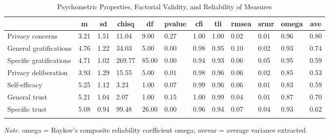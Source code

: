 \documentclass[
  english,
  man,floatsintext]{apa6}
\begin{document}
\begin{table}[tbp]

\begin{center}
\begin{threeparttable}

\caption{\label{tab:CFA}Psychometric Properties, Factorial Validity, and Reliability of Measures}

\footnotesize{

\begin{tabular}{llllllllllll}
\toprule
 & \multicolumn{1}{c}{m} & \multicolumn{1}{c}{sd} & \multicolumn{1}{c}{chisq} & \multicolumn{1}{c}{df} & \multicolumn{1}{c}{pvalue} & \multicolumn{1}{c}{cfi} & \multicolumn{1}{c}{tli} & \multicolumn{1}{c}{rmsea} & \multicolumn{1}{c}{srmr} & \multicolumn{1}{c}{omega} & \multicolumn{1}{c}{ave}\\
\midrule
Privacy concerns & 3.21 & 1.51 & 11.04 & 9.00 & 0.27 & 1.00 & 1.00 & 0.02 & 0.01 & 0.96 & 0.80\\
General gratifications & 4.76 & 1.22 & 34.03 & 5.00 & 0.00 & 0.98 & 0.95 & 0.10 & 0.02 & 0.93 & 0.74\\
Specific gratifications & 4.71 & 1.02 & 269.77 & 85.00 & 0.00 & 0.94 & 0.93 & 0.06 & 0.05 & 0.95 & 0.59\\
Privacy deliberation & 3.93 & 1.29 & 15.55 & 5.00 & 0.01 & 0.98 & 0.96 & 0.06 & 0.02 & 0.85 & 0.53\\
Self-efficacy & 5.25 & 1.12 & 3.23 & 1.00 & 0.07 & 0.99 & 0.96 & 0.06 & 0.01 & 0.83 & 0.59\\
General trust & 5.21 & 1.04 & 2.07 & 1.00 & 0.15 & 1.00 & 0.99 & 0.04 & 0.01 & 0.87 & 0.70\\
Specific trust & 5.08 & 0.94 & 99.48 & 26.00 & 0.00 & 0.96 & 0.94 & 0.07 & 0.04 & 0.93 & 0.62\\
\bottomrule
\addlinespace
\end{tabular}

}

\begin{tablenotes}[para]
\normalsize{\textit{Note.} omega = Raykov's composite reliability coefficient omega; avevar = average variance extracted.}
\end{tablenotes}

\end{threeparttable}
\end{center}

\end{table}
\end{document}

